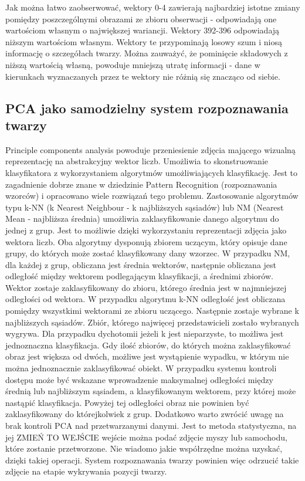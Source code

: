 \documentclass[oneside, eng]{mgr}
\begin{document}
Jak można łatwo zaobserwować, wektory 0-4 zawierają najbardziej istotne zmiany pomiędzy poszczególnymi obrazami ze zbioru obserwacji - odpowiadają one wartościom własnym o największej wariancji. Wektory 392-396 odpowiadają niższym wartościom własnym. Wektory te przypominają losowy szum i niosą informację o szczegółach twarzy. Można zauważyć, że pominięcie składowych z niższą wartością własną, powoduje mniejszą utratę informacji - dane w kierunkach wyznaczanych przez te wektory nie różnią się znacząco od siebie.

\subsection{PCA jako samodzielny system rozpoznawania twarzy}
Principle components analysis powoduje przeniesienie zdjęcia mającego wizualną reprezentację na abstrakcyjny wektor liczb. Umożliwia to skonstruowanie klasyfikatora z wykorzystaniem algorytmów umożliwiających klasyfikację. Jest to zagadnienie dobrze znane w dziedzinie Pattern Recognition (rozpoznawania wzorców) i opracowano wiele rozwiązań tego problemu. Zastosowanie algorytmów typu k-NN (k Nearest Neighbour - k najbliższych sąsiadów) lub NM (Nearest Mean - najbliższa średnia) umożliwia zaklasyfikowanie danego algorytmu do jednej z grup. Jest to możliwie dzięki wykorzystaniu reprezentacji zdjęcia jako wektora liczb. Oba algorytmy dysponują zbiorem uczącym, który opisuje dane grupy, do których może zostać klasyfikowany dany wzorzec. 
W przypadku NM, dla każdej z grup, obliczana jest średnia wektorów, następnie obliczana jest odległość między wektorem podlegającym klasyfikacji, a średnimi zbiorów. Wektor zostaje zaklasyfikowany do zbioru, którego średnia jest w najmniejszej odległości od wektora. 
W przypadku algorytmu k-NN odległość jest obliczana pomiędzy wszystkimi wektorami ze zbioru uczącego. Następnie zostaje wybrane k najbliższych sąsiadów. Zbiór, którego najwięcej przedstawicieli zostało wybranych wygrywa. Dla przypadku dychotomii jeżeli k jest nieparzyste, to możliwa jest jednoznaczna klasyfikacja. Gdy ilość zbiorów, do których można zaklasyfikować obraz jest większa od dwóch, możliwe jest wystąpienie wypadku, w którym nie można jednoznacznie zaklasyfikować obiekt. 
W przypadku systemu kontroli dostępu może być wskazane wprowadzenie maksymalnej odległości między średnią lub najbliższym sąsiadem, a klasyfikowanym wektorem, przy której może nastąpić klasyfikacja. Powyżej tej odległości obraz nie powinien być zaklasyfikowany do którejkolwiek z grup. 
Dodatkowo warto zwrócić uwagę na brak kontroli PCA nad przetwarzanymi danymi. Jest to metoda statystyczna, na jej ZMIEŃ TO WEJŚCIE wejście można podać zdjęcie myszy lub samochodu, które zostanie przetworzone. Nie wiadomo jakie współrzędne można uzyskać, dzięki takiej operacji. System rozpoznawania twarzy powinien więc odrzucić takie zdjęcie na etapie wykrywania pozycji twarzy.
\end{document}
